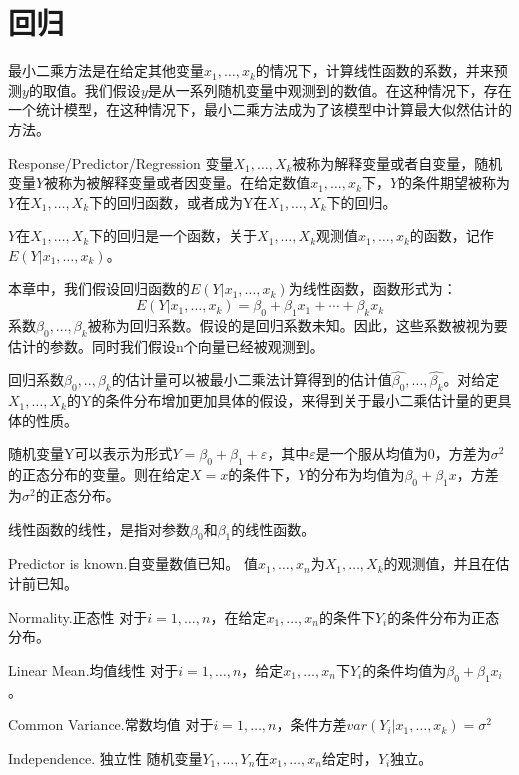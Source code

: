 \documentclass[../main.tex]{subfiles}
\begin{document}
\chapter{回归}
最小二乘方法是在给定其他变量$x_1,\dots,x_k$的情况下，计算线性函数的系数，并来预测$y$的取值。我们假设$y$是从一系列随机变量中观测到的数值。在这种情况下，存在一个统计模型，在这种情况下，最小二乘方法成为了该模型中计算最大似然估计的方法。

\begin{definition}{Response/Predictor/Regression}{}
变量$X_1,\dots,X_k$被称为解释变量或者自变量，随机变量$Y$被称为被解释变量或者因变量。在给定数值$x_1,\dots,x_k$下，$Y$的条件期望被称为$Y$在$X_1,\dots,X_k$下的回归函数，或者成为Y在$X_1,\dots,X_k$下的回归。
\end{definition}

$Y$在$X_1,\dots,X_k$下的回归是一个函数，关于$X_1,\dots,X_k$观测值$x_1,\dots,x_k$的函数，记作$E(Y|x_1,\dots,x_k)$。

本章中，我们假设回归函数的$E(Y|x_1,\dots,x_k)$为线性函数，函数形式为：
\begin{equation}\label{}
E(Y|x_1,\dots,x_k)=\beta_0+\beta_1x_1+\cdots+\beta_kx_k
\end{equation}
系数$\beta_0, . . . , \beta_k$被称为回归系数。假设的是回归系数未知。因此，这些系数被视为要估计的参数。同时我们假设n个向量已经被观测到。

回归系数$\beta_0,..,\beta_k$的估计量可以被最小二乘法计算得到的估计值$\hat{\beta_0},\dots,\hat{\beta_k}$。对给定$X_1,\dots,X_k$的Y的条件分布增加更加具体的假设，来得到关于最小二乘估计量的更具体的性质。

随机变量Y可以表示为形式$Y=\beta_0+\beta_1+\varepsilon$，其中$\varepsilon$是一个服从均值为0，方差为$\sigma^2$的正态分布的变量。则在给定$X=x$的条件下，$Y$的分布为均值为$\beta_0+\beta_1x$，方差为$\sigma^2$的正态分布。

线性函数的线性，是指对参数$\beta_0$和$\beta_1$的线性函数。

\begin{assumption}{Predictor is known.自变量数值已知。}{}
值$x_1,\dots,x_n$为$X_1,\dots,X_k$的观测值，并且在估计前已知。
\end{assumption}

\begin{assumption}{Normality.正态性}
对于$i=1,\dots,n$，在给定$x_1,\dots,x_n$的条件下$Y_i$的条件分布为正态分布。
\end{assumption}

\begin{assumption}{Linear Mean.均值线性}{}
对于$i=1,\dots,n$，给定$x_1,\dots,x_n$下$Y_i$的条件均值为$\beta_0+\beta_1x_i$。
\end{assumption}


\begin{assumption}{Common Variance.常数均值}{}
对于$i=1,\dots,n$，条件方差$var(Y_i|x_1,\dots,x_k)=\sigma^2$
\end{assumption}

\begin{assumption}{Independence. 独立性}{}
随机变量$Y_1,\dots,Y_n$在$x_1,\dots, x_n$给定时，$Y_i$独立。
\end{assumption}
\end{document}

